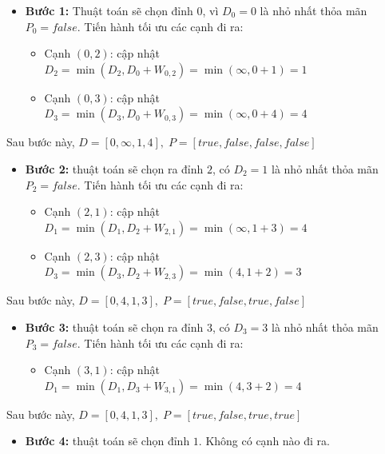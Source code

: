 \begin{itemize}
    \item \textbf{Bước 1:} Thuật toán sẽ chọn đỉnh $0$, vì $D_0 = 0$ là nhỏ nhất thỏa mãn $P_0 = false$. Tiến hành tối ưu các cạnh đi ra:
    \begin{itemize}
        \item Cạnh $(0,2)$: cập nhật $D_2 = \min(D_2, D_0 + W_{0,2}) = \min(\infty, 0+1) = 1$
        \item Cạnh $(0,3)$: cập nhật $D_3 = \min(D_3, D_0 + W_{0,3}) = \min(\infty, 0+4) = 4$
    \end{itemize}
\end{itemize}

Sau bước này, $D = [0, \infty, 1, 4],\; P = [true, false, false, false]$

\begin{itemize}
    \item \textbf{Bước 2:} thuật toán sẽ chọn ra đỉnh $2$, có $D_2 = 1$ là nhỏ nhất thỏa mãn $P_2 = false$. Tiến hành tối ưu các cạnh đi ra:
    \begin{itemize}
        \item Cạnh $(2,1)$: cập nhật $D_1 = \min(D_1, D_2 + W_{2,1}) = \min(\infty, 1 + 3) = 4$
        \item Cạnh $(2,3)$: cập nhật $D_3 = \min(D_3, D_2 + W_{2,3}) = \min(4, 1 + 2) = 3$
    \end{itemize}
\end{itemize}

Sau bước này, $D = [0, 4, 1, 3],\; P = [true, false, true, false]$

\begin{itemize}
    \item \textbf{Bước 3:} thuật toán sẽ chọn ra đỉnh $3$, có $D_3 = 3$ là nhỏ nhất thỏa mãn $P_3 = false$. Tiến hành tối ưu các cạnh đi ra:
    \begin{itemize}
        \item Cạnh $(3,1)$: cập nhật $D_1 = \min(D_1, D_3 + W_{3,1}) = \min(4, 3 + 2) = 4$
    \end{itemize}
\end{itemize}

Sau bước này, $D = [0, 4, 1, 3],\; P = [true, false, true, true]$

\begin{itemize}
    \item \textbf{Bước 4:} thuật toán sẽ chọn đỉnh $1$. Không có cạnh nào đi ra.
\end{itemize}

